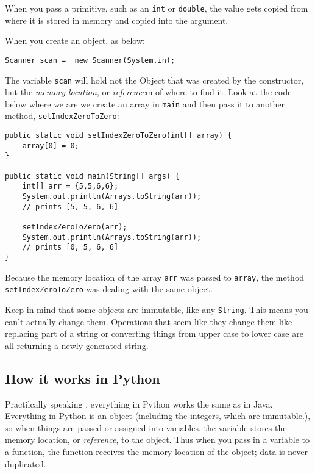 When you pass a primitive, such as an \texttt{int} or \texttt{double}, the value gets copied from where it is stored in memory and copied into the argument.

When you create an object, as below:
\begin{verbatim}
Scanner scan =  new Scanner(System.in);
\end{verbatim}

The variable \texttt{scan} will hold not the Object that was created by the constructor, but the \textit{memory location}, or  \textit{reference}m of where to find it.
Look at the code below where we are we create an array in \texttt{main} and then pass it to another method, \texttt{setIndexZeroToZero}:

\begin{verbatim}
public static void setIndexZeroToZero(int[] array) {
	array[0] = 0;
}

public static void main(String[] args) {
	int[] arr = {5,5,6,6};
	System.out.println(Arrays.toString(arr));
	// prints [5, 5, 6, 6]
	
	setIndexZeroToZero(arr);
	System.out.println(Arrays.toString(arr));
	// prints [0, 5, 6, 6]
}

\end{verbatim}

Because the memory location of the array \texttt{arr} was passed to \texttt{array}, the method \texttt{setIndexZeroToZero} was dealing with the same object. 


Keep in mind that some objects are immutable, like any \texttt{String}.  This means you can't actually change them.  Operations that seem like they change them like replacing part of a string or converting things from upper case to lower case are all returning a newly generated string.
\subsection{How it works in Python}

Practilcally  speaking , everything in Python works the same as in Java.
Everything in Python is an object (including the integers, which are immutable.), so when things are passed or assigned into variables, the variable stores the memory location, or \textit{reference}, to the object.  
Thus when you pass in a variable to a function, the function receives the memory location of the object; data is never duplicated.